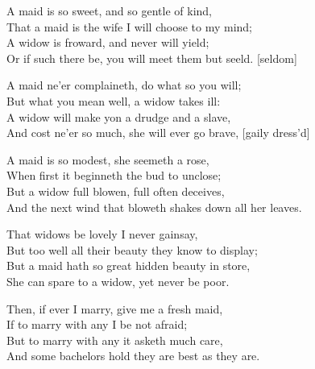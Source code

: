 \pagebreak
\settowidth{\versewidth}{And cost ne’er so much, she will ever go brave, [gaily dress’d]}
\begin{scverse}
A maid is so sweet, and so gentle of kind,\\
That a maid is the wife I will choose to my mind;\\
A widow is froward, and never will yield;\\
Or if such there be, you will meet them but seeld. [seldom]

A maid ne’er complaineth, do what so you will;\\
But what you mean well, a widow takes ill:\\
A widow will make yon a drudge and a slave,\\
And cost ne’er so much, she will ever go brave, [gaily dress’d]

A maid is so modest, she seemeth a rose,\\
When first it beginneth the bud to unclose;\\
But a widow full blowen, full often deceives,\\
And the next wind that bloweth shakes down all her leaves.

That widows be lovely I never gainsay,\\
But too well all their beauty they know to display;\\
But a maid hath so great hidden beauty in store,\\
She can spare to a widow, yet never be poor.

Then, if ever I marry, give me a fresh maid,\\
If to marry with any I be not afraid;\\
But to marry with any it asketh much care,\\
And some bachelors hold they are best as they are.
\end{scverse}
\vfill
\centerrule
\vfill

\pagebreak
